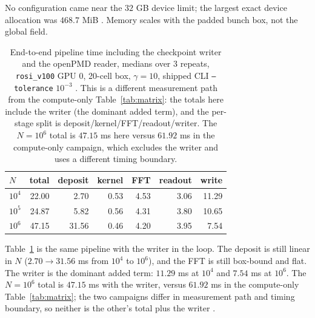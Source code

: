 No configuration came near the $32$ GB device limit; the largest exact device
allocation was $468.7$ MiB \citep{SB1}. Memory scales with the padded bunch
box, not the global field.

\begin{table}[t]
\centering
\small
\caption{End-to-end pipeline time including the checkpoint writer and the
openPMD reader, medians over 3 repeats, \texttt{rosi\_v100} GPU 0, 20-cell
box, $\gamma=10$, shipped CLI \texttt{--tolerance} $10^{-3}$
\citep{W4b}. This is a different measurement path from the compute-only
Table~\ref{tab:matrix}: the totals here include the writer (the dominant
added term), and the per-stage split is deposit/kernel/FFT/readout/writer.
The $N=10^6$ total is $47.15$ ms here versus $61.92$ ms in the compute-only
campaign, which excludes the writer and uses a different timing boundary.}
\label{tab:e2e}
\begin{tabular}{lrrrrrr}
\toprule
$N$ & total & deposit & kernel & FFT & readout & write \\
\midrule
$10^{4}$  & 22.00 & 2.70  & 0.53 & 4.53 & 3.06 & 11.29 \\
$10^{5}$  & 24.87 & 5.82  & 0.56 & 4.31 & 3.80 & 10.65 \\
$10^{6}$  & 47.15 & 31.56 & 0.46 & 4.20 & 3.95 & 7.54  \\
\bottomrule
\end{tabular}
\end{table}

Table~\ref{tab:e2e} is the same pipeline with the writer in the loop. The
deposit is still linear in $N$ ($2.70\to31.56$ ms from $10^4$ to $10^6$), and
the FFT is still box-bound and flat. The writer is the dominant added term:
$11.29$ ms at $10^4$ and $7.54$ ms at $10^6$. The $N=10^6$ total is $47.15$ ms
with the writer, versus $61.92$ ms in the compute-only
Table~\ref{tab:matrix}; the two campaigns differ in measurement path and
timing boundary, so neither is the other's total plus the writer
\citep{W4b,SB1}.
